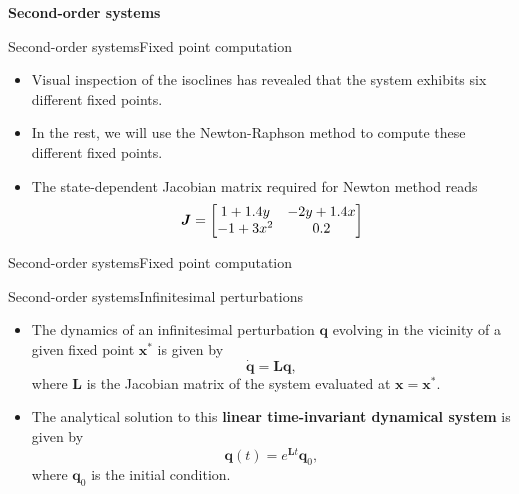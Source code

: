 \documentclass[usenames,dvipsnames,svgnames,10pt,aspectratio=169]{beamer}
\begin{document}
\begin{frame}[t, c]{}
	\centering
	\vspace{1cm}

	{\Large \textbf{Second-order systems}}

	\bigskip

	{}

\end{frame}

\begin{frame}[t, c]{Second-order systems}{Fixed point computation}
	\begin{itemize}
		\item Visual inspection of the isoclines has revealed that the system exhibits six different fixed points.

		\bigskip

		\item In the rest, we will use the Newton-Raphson method to compute these different fixed points.

		\bigskip

		\item The state-dependent Jacobian matrix required for Newton method reads
		\begin{equation}
			{\bm J} = \begin{bmatrix}
									1 + 1.4y & -2 y + 1.4 x \\
									-1 + 3 x^2 & 0.2
								\end{bmatrix}
			\notag
		\end{equation}
	\end{itemize}

	\vspace{1cm}
\end{frame}

\begin{frame}[t, c]{Second-order systems}{Fixed point computation}

\end{frame}

\begin{frame}[t, c]{Second-order systems}{Infinitesimal perturbations}
	\begin{itemize}
		\item The dynamics of an infinitesimal perturbation ${\bm q}$ evolving in the vicinity of a given fixed point ${\bm x}^*$ is given by
		$$\dot{\bm q} = {\bm L}{\bm q},$$
		where ${\bm L}$ is the Jacobian matrix of the system evaluated at ${\bm x} = {\bm x}^*$.

		\bigskip

		\item The analytical solution to this \alert{\textbf{linear time-invariant dynamical system}} is given by
		$${\bm q}(t) = e^{{\bm L}t}{\bm q}_0,$$
		where ${\bm q}_0$ is the initial condition.
	\end{itemize}

	\vspace{1cm}
\end{frame}
\end{document}
